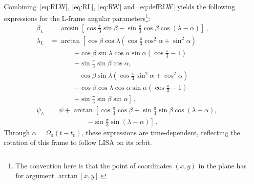 \documentclass[aps,showpacs,twocolumn,prd,superscriptaddress,nofootinbib]{revtex4-1}
\newcommand{\bsub}{\begin{subequations}}
\newcommand{\esub}{\end{subequations}}
\newcommand{\nn}{\nonumber}
\begin{document}
Combining~\eqref{eq:RLW}, \eqref{eq:RL}, \eqref{eq:RW} and~\eqref{eq:defRLW} yields the following expressions for the L-frame angular parameters\footnote{The convention here is that the point of coordinates $(x,y)$ in the plane has for argument $\arctan\left[ x, y \right]$.}:
\bsub\label{eq:Lframeangles}
\begin{align}
	\beta_{L} &= \arcsin \left[ \cos \frac{\pi}{3} \sin \beta - \sin \frac{\pi}{3} \cos \beta \cos \left( \lambda - \alpha \right) \right] \,,\\
	\lambda_{L} &= \arctan \left[ \cos\beta \cos\lambda \left( \cos \frac{\pi}{3} \cos^{2}\alpha + \sin^{2}\alpha \right) \right. \nn\\
	& \qquad\quad\;\; \left. + \cos\beta \sin\lambda \cos\alpha \sin\alpha \left( \cos\frac{\pi}{3} - 1 \right) \right. \nn\\
	& \qquad\quad\;\; \left. + \sin\frac{\pi}{3} \sin\beta \cos\alpha , \right. \nn\\
	& \qquad\qquad\; \left. \cos\beta \sin\lambda \left( \cos \frac{\pi}{3} \sin^{2}\alpha + \cos^{2}\alpha \right) \right. \nn\\
	& \qquad\quad\;\; \left. + \cos\beta \cos\lambda \cos\alpha \sin\alpha \left( \cos\frac{\pi}{3} - 1 \right) \right. \nn\\
	& \qquad\quad\;\; \left. + \sin\frac{\pi}{3} \sin\beta \sin\alpha \right] \,,\\
	\psi_{L} &= \psi + \arctan \left[\cos\frac{\pi}{3}\cos\beta + \sin\frac{\pi}{3} \sin\beta \cos(\lambda - \alpha), \right. \nn\\
	&\qquad\qquad\quad\;\; \left.-\sin \frac{\pi}{3} \sin(\lambda - \alpha) \right] \,.
\end{align}
\esub
Through $\alpha = \Omega_{0} (t-t_{0}) $, these expressions are time-dependent, reflecting the rotation of this frame to follow LISA on its orbit.
\end{document}
